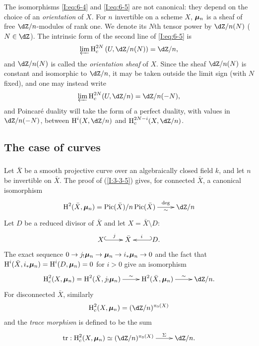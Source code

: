 The isomorphisms \eqref{I:eq:6-4} and \eqref{I:eq:6-5} are not
canonical: they depend on the choice of an \emph{orientation} of $X$.
For $n$ invertible on a scheme $X$, ${\bm\mu}_n$ is a sheaf of free
$\dZ/n$-modules of rank one. We denote its $N$th tensor power by
$\dZ/n(N)$ ($N\in\dZ$). The intrinsic form of the second line of
\eqref{I:eq:6-5} is
\begin{equation}\label{I:eq:6-5'}
  \varprojlim \h_c^{2N} \left(U,\dZ/n(N)\right) = \dZ/n \text{,}
\end{equation}
and $\dZ/n(N)$ is called the \emph{orientation sheaf} of $X$. Since the
sheaf $\dZ/n(N)$ is constant and isomorphic to $\dZ/n$, it may be taken
outside the limit sign (with $N$ fixed), and one may instead write
\begin{equation}\label{I:eq:6-5''}
  \varprojlim \h_c^{2N} (U,\dZ/n) = \dZ/n(-N) \text{,}
\end{equation}
and Poincaré duality will take the form of a perfect duality, with values
in $\dZ/n(-N)$, between $\h^i(X,\dZ/n)$ and
$\h_c^{2N-i}(X,\dZ/n)$.

\subsection{The case of curves}\label{I:6-2}

\subsubsection{}\label{I:6-2-1}

Let $\bar X$ be a smooth projective curve over an algebraically closed
field $k$, and let $n$ be invertible on $\bar X$. The proof of
(\ref{I:3-3-5}) gives, for connected $\bar X$, a canonical isomorphism
\[\xymatrix{
  \h^2(\bar X,\dmu_n) = \pic(\bar X)/n\pic(\bar X) \ar[r]^-{\deg}_-{\sim}
    & \dZ/n
}\]
Let $D$ be a reduced divisor of $\bar X$ and let
$X=\bar X\setminus D$:
\[\xymatrix{
  X \ar@{^{(}->}[r]^-j
    & \bar X
    & \ar@{_{(}->}[l]_-i D \text{.}
}\]
The exact sequence
$0\to j_!{\bm\mu}_n\to{\bm\mu}_n\to i_*{\bm\mu}_n\to0$ and the fact that
$\operatorname{H}^i(\bar X,i_*{\bm\mu}_n)=\operatorname{H}^i(D,{\bm\mu}_n)=0$ for $i>0$ give an
isomorphism
\[\xymatrix{
  \h_c^2(X,\dmu_n) = \h^2(\bar X,j_! \dmu_n) \ar[r]^-\sim
    & \h^2(\bar X,\dmu_n) \ar[r]^-\sim
    & \dZ/n \text{.}
}\]
For disconnected $\bar X$, similarly
\[
  \h_c^2(X,\dmu_n) = (\dZ/n)^{\pi_0(X)}
\]
and the \emph{trace morphism} is defined to be the sum
\[\xymatrix{
  \tr : \h_c^2(X,\dmu_n) \simeq (\dZ/n)^{\pi_0(X)} \ar[r]^-\Sigma
    & \dZ/n\text{.}
}\]

